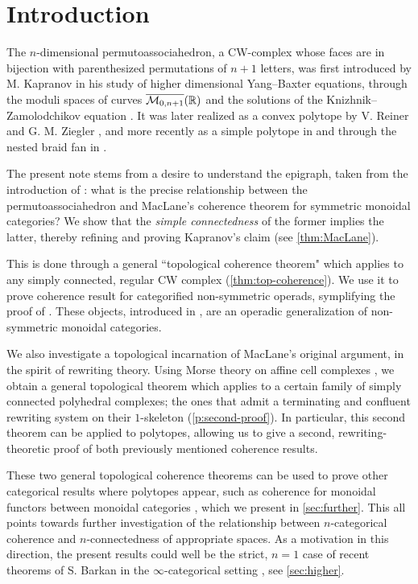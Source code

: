 
\section*{Introduction} 
\label{s:introduction}

The $n$-dimensional permutoassociahedron, a CW-complex whose faces are in bijection with parenthesized permutations of $n+1$ letters, was first introduced by M. Kapranov in his study of higher dimensional Yang--Baxter equations, through the moduli spaces of curves $\overline{\mathcal{M}_{0,n+1}}(\mathbb R)$ and the solutions of the Knizhnik--Zamolodchikov equation \cite{kapranov1993}.
It was later realized as a convex polytope by V. Reiner and G. M. Ziegler \cite{reinerCoxeterassociahedra1994}, and more recently as a simple polytope in \cite{baralicSimplePermutoassociahedron2019} and through the nested braid fan in \cite{CastilloLiu21}.

The present note stems from a desire to understand the epigraph, taken from the introduction of \cite{kapranov1993}: what is the precise relationship between the permutoassociahedron and MacLane's coherence theorem for symmetric monoidal categories? 
We show that the \emph{simple connectedness} of the former implies the latter, thereby refining and proving Kapranov's claim (see \cref{thm:MacLane}).

This is done through a general ``topological coherence theorem" which applies to any simply connected, regular CW complex (\cref{thm:top-coherence}).
We use it to prove coherence result for categorified non-symmetric operads, symplifying the proof of \cite{DP15}. 
These objects, introduced in \cite{DP15}, are an operadic generalization of non-symmetric monoidal categories. 

We also investigate a topological incarnation of MacLane's original argument, in the spirit of rewriting theory. 
Using Morse theory on affine cell complexes \cite{bestvinaMorseTheoryFiniteness1997}, we obtain a general topological theorem which applies to a certain family of simply connected polyhedral complexes; the ones that admit a terminating and confluent rewriting system on their $1$-skeleton (\cref{p:second-proof}). 
In particular, this second theorem can be applied to polytopes, allowing us to give a second, rewriting-theoretic proof of both previously mentioned coherence results. 

These two general topological coherence theorems can be used to prove other categorical results where polytopes appear, such as coherence for monoidal functors between monoidal categories \cite{epsteinFunctorsTensoredCategories1966}, which we present in \cref{sec:further}.
This all points towards further investigation of the relationship between $n$-categorical coherence and $n$-connectedness of appropriate spaces.
As a motivation in this direction, the present results could well be the strict, $n=1$ case of recent theorems of S. Barkan in the $\infty$-categorical setting \cite{barkanArityApproximationInfty2022}, see \cref{sec:higher}.

